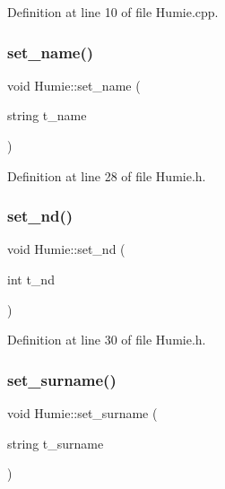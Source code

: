 Definition at line 10 of file Humie.\+cpp.

\mbox{\label{class_humie_ad017a3f3950555056f3e9e9c904399c8}} 
\subsubsection{\texorpdfstring{set\_name()}{set\_name()}}
{\footnotesize\ttfamily void Humie\+::set\+\_\+name (\begin{DoxyParamCaption}\item[{string}]{t\+\_\+name }\end{DoxyParamCaption})\hspace{0.3cm}{\ttfamily [inline]}}



Definition at line 28 of file Humie.\+h.

\mbox{\label{class_humie_aa73ce86c3603663083ae0d5c8b532157}} 
\subsubsection{\texorpdfstring{set\_nd()}{set\_nd()}}
{\footnotesize\ttfamily void Humie\+::set\+\_\+nd (\begin{DoxyParamCaption}\item[{int}]{t\+\_\+nd }\end{DoxyParamCaption})\hspace{0.3cm}{\ttfamily [inline]}}



Definition at line 30 of file Humie.\+h.

\mbox{\label{class_humie_ac42c5deca59ef1519b43fa4cb203f551}} 
\subsubsection{\texorpdfstring{set\_surname()}{set\_surname()}}
{\footnotesize\ttfamily void Humie\+::set\+\_\+surname (\begin{DoxyParamCaption}\item[{string}]{t\+\_\+surname }\end{DoxyParamCaption})\hspace{0.3cm}{\ttfamily [inline]}}



